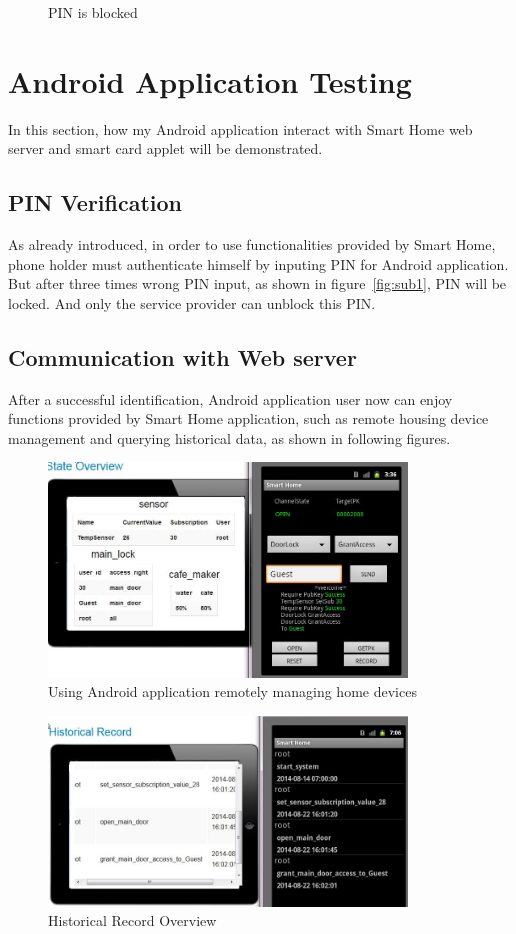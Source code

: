 \begin{figure}[!htb]
\begin{minipage}{0.49\linewidth}
  \caption{PIN is blocked}
  \label{fig:sub2}
\end{minipage}
  \end{figure}
\section{Android Application Testing}
In this section, how my Android application interact with Smart Home web server and smart card applet will be demonstrated.

\subsection{PIN Verification}

As already introduced, in order to use functionalities provided by Smart Home, phone holder must authenticate himself by inputing PIN for Android application. But after three times wrong PIN input, as shown in figure~\ref{fig:sub1}, PIN will be locked. And only the service provider can unblock this PIN. 
\subsection{Communication with Web server}
After a successful identification, Android application user now can enjoy functions provided by Smart Home application, such as remote housing device management and querying historical data, as shown in following figures.

\begin{figure}[!htb]
	\centering
	\includegraphics[width=0.85\textwidth]{Images/impl/housing-device.jpg}
		\caption{Using Android application remotely managing home devices}
	\label{fig:housing-device}
\end{figure}

\begin{figure}[!htb]
	\centering
	\includegraphics[width=0.85\textwidth]{Images/impl/record-query.jpg}
		\caption{Historical Record Overview}
	\label{fig:record-query}
\end{figure}
